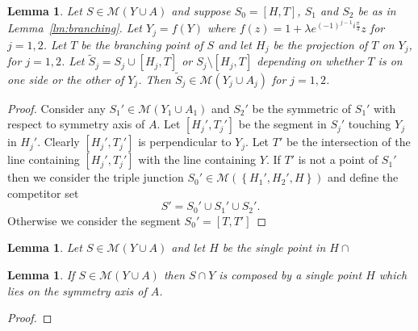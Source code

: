 \documentclass{article}
\newcommand{\ENCLOSE}[1]{\left\{#1\right\}}
\newcommand{\M}{\mathcal{M}}
\newtheorem{lemma}[theorem]{Lemma}
\theoremstyle{definition}
\theoremstyle{remark}
\begin{document}
\begin{lemma}\label{lm:iteration}
  Let $S\in\M(Y\cup A)$ and suppose $S_0=[H,T]$, $S_1$ and $S_2$
  be as in Lemma~\ref{lm:branching}.
  Let $Y_j= f(Y)$ where $f(z) = 1+\lambda e^{(-1)^{j-1} i \frac \pi 3} z$ 
  for $j=1,2$.
  Let $T$ be the branching point of $S$ 
  and let $H_j$ be the projection of $T$ on $Y_j$, 
  for $j=1,2$. 
  Let $\tilde S_j = S_j\cup [H_j,T]$ 
  or $S_j \setminus [H_j,T]$
  depending on whether $T$ is on one side or 
  the other of $Y_j$.
  Then $\tilde S_j \in \M(Y_j\cup A_j)$ for $j=1,2$.
\end{lemma}
%
\begin{proof}
  Consider any $S_1'\in \M(Y_1\cup A_1)$ and $S_2'$ be the symmetric 
  of $S_1'$ with respect to symmetry axis of $A$.
  Let $[H_j',T_j']$ be the segment in $S_j'$ touching $Y_j$ in $H_j'$.
  Clearly $[H_j',T_j']$ is perpendicular to $Y_j$.
  Let $T'$ be the intersection of the line containing $[H_j',T_j']$
  with the line containing $Y$.
  If $T'$ is not a point of $S_1'$ then we consider the 
  triple junction $S_0'\in \M(\ENCLOSE{H_1',H_2',H})$ and
  define the competitor set 
  \[
    S' = S_0' \cup S_1' \cup S_2'.
  \]
  Otherwise we consider the segment 
  $S_0'=[T,T']$
\end{proof}

\begin{lemma}
  Let $S\in \M(Y\cup A)$ and let $H$ be the single point 
  in $H\cap $
\end{lemma}

\begin{lemma}
  If $S\in \M(Y\cup A)$ then $S\cap Y$ is composed by a single 
  point $H$ which lies on the symmetry axis of $A$.
\end{lemma}
\begin{proof}

\end{proof}
\end{document}
